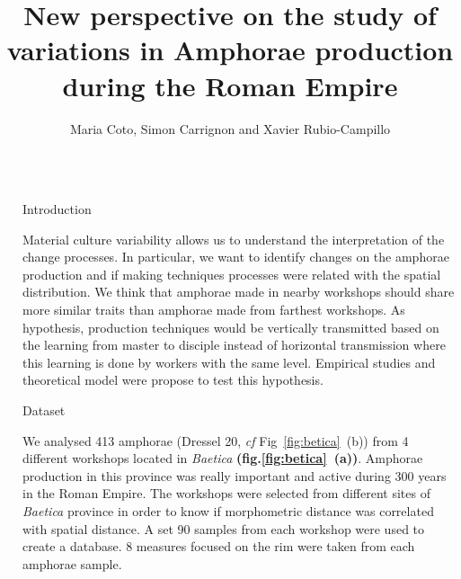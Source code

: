 \documentclass[final]{beamer}
\title{New perspective on the study of variations in Amphorae production during the Roman Empire} %
\author{Maria Coto, Simon Carrignon and Xavier Rubio-Campillo} %
\institute{Barcelona Supercomputing Center - University of Barcelona} %
\newlength{\sepwid}
\newlength{\onecolwid}
\begin{document}

\setlength{\belowcaptionskip}{2ex} %
\setlength\belowdisplayshortskip{2ex} %

\begin{frame}[t] %

\begin{columns}[t] %

\begin{column}{\sepwid}\end{column} %

\begin{column}{\onecolwid} %


\begin{block}{Introduction}

\justify

Material culture variability allows us to understand the interpretation of the change processes. In particular, we want to identify changes on the amphorae production and if making techniques processes were related with the spatial distribution. We think that amphorae made in nearby workshops should share more similar traits than amphorae made from farthest workshops. As hypothesis, production techniques would be vertically transmitted based on the learning from master to disciple instead of horizontal transmission where this learning is done by workers with the same level. Empirical studies and theoretical model were propose to test this hypothesis.
 
  
\end{block}


\begin{block}{Dataset}

\justify
We analysed 413 amphorae (Dressel 20, \emph{cf} Fig~\ref{fig:betica}~(b)) from 4 different workshops located in \emph{Baetica} \textbf{(fig.\ref{fig:betica}~(a))}. Amphorae production in this province was really important and active during 300 years in the Roman Empire. The workshops were selected from different sites of \emph{Baetica} province in order to know if morphometric distance was correlated with spatial distance. A set 90 samples from each workshop were used to create a database. 8 measures focused on the rim were taken from each amphorae sample. 


\end{block}
\end{column}
\end{columns}
\end{frame}
\end{document}
